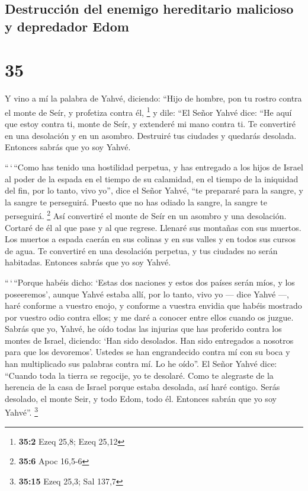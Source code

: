 \hypertarget{destrucciuxf3n-del-enemigo-hereditario-malicioso-y-depredador-edom}{%
\subsection{Destrucción del enemigo hereditario malicioso y depredador
Edom}\label{destrucciuxf3n-del-enemigo-hereditario-malicioso-y-depredador-edom}}

\hypertarget{section-34}{%
\section{35}\label{section-34}}

 Y vino a mí la palabra de Yahvé, diciendo: 
``Hijo de hombre, pon tu rostro contra el monte de Seír, y profetiza
contra él, \footnote{\textbf{35:2} Ezeq 25,8; Ezeq 25,12} 
y dile: ``El Señor Yahvé dice: ``He aquí que estoy contra ti, monte de
Seír, y extenderé mi mano contra ti. Te convertiré en una desolación y
en un asombro.  Destruiré tus ciudades y quedarás
desolada. Entonces sabrás que yo soy Yahvé.

 ``\,`\,``Como has tenido una hostilidad perpetua, y has
entregado a los hijos de Israel al poder de la espada en el tiempo de su
calamidad, en el tiempo de la iniquidad del fin,  por lo
tanto, vivo yo'', dice el Señor Yahvé, ``te prepararé para la sangre, y
la sangre te perseguirá. Puesto que no has odiado la sangre, la sangre
te perseguirá. \footnote{\textbf{35:6} Apoc 16,5-6}  Así
convertiré el monte de Seír en un asombro y una desolación. Cortaré de
él al que pase y al que regrese.  Llenaré sus montañas con
sus muertos. Los muertos a espada caerán en sus colinas y en sus valles
y en todos sus cursos de agua.  Te convertiré en una
desolación perpetua, y tus ciudades no serán habitadas. Entonces sabrás
que yo soy Yahvé.

 ``\,`\,``Porque habéis dicho: `Estas dos naciones y
estos dos países serán míos, y los poseeremos', aunque Yahvé estaba
allí,  por lo tanto, vivo yo --- dice Yahvé ---, haré
conforme a vuestro enojo, y conforme a vuestra envidia que habéis
mostrado por vuestro odio contra ellos; y me daré a conocer entre ellos
cuando os juzgue.  Sabrás que yo, Yahvé, he oído todas
las injurias que has proferido contra los montes de Israel, diciendo:
`Han sido desolados. Han sido entregados a nosotros para que los
devoremos'.  Ustedes se han engrandecido contra mí con su
boca y han multiplicado sus palabras contra mí. Lo he oído''.
 El Señor Yahvé dice: ``Cuando toda la tierra se
regocije, yo te desolaré.  Como te alegraste de la
herencia de la casa de Israel porque estaba desolada, así haré contigo.
Serás desolado, el monte Seir, y todo Edom, todo él. Entonces sabrán que
yo soy Yahvé''. \footnote{\textbf{35:15} Ezeq 25,3; Sal 137,7}

